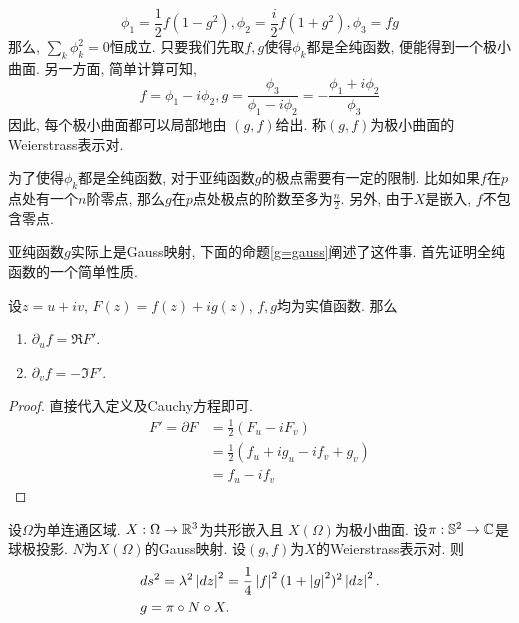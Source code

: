 \begin{equation}
    \phi_1=\frac{1}{2}f(1-g^2), \phi_2=\frac{i}{2} f(1+g^2), \phi_3=fg
\end{equation}
那么, $\sum_k \phi_k^2=0$恒成立. 只要我们先取$f,g$使得$\phi_k$都是全纯函数, 便能得到一个极小曲面. 另一方面, 简单计算可知, 
\begin{equation}
    f=\phi_1-i\phi_2, g=\frac{\phi_3}{\phi_1-i\phi_2}= -\frac{\phi_1+i\phi_2}{\phi_3}
\end{equation}
因此, 每个极小曲面都可以局部地由 $(g,f)$给出. 称$(g,f)$为极小曲面的Weierstrass表示对. 
\begin{remark}
    为了使得$\phi_k$都是全纯函数, 对于亚纯函数$g$的极点需要有一定的限制. 比如如果$f$在$p$点处有一个$n$阶零点, 那么$g$在$p$点处极点的阶数至多为$\frac{n}{2}$. 另外, 由于$X$是嵌入, $f$不包含零点.
\end{remark}
亚纯函数$g$实际上是Gauss映射, 下面的命题\eqref{g=gauss}阐述了这件事.  首先证明全纯函数的一个简单性质.
\begin{lemma}
    设$z=u+iv$, $F(z)=f(z)+ig(z)$, $f,g$均为实值函数. 那么
    \begin{enumerate}
        \item $\partial_u f = \Re F'$.
        \item $\partial_v f = -\Im F' $.
    \end{enumerate}
\end{lemma}
\begin{proof}
    直接代入定义及Cauchy方程即可.
    \begin{equation}
        \begin{split}
            F'=\partial F & = \frac{1}{2}(F_u-iF_v) \\
             &= \frac{1}{2}(f_u+ig_u-if_v+g_v) \\
             &= f_u-if_v
        \end{split}
    \end{equation}
\end{proof}
\begin{proposition} \label{g=gauss}
    设$\Omega$为单连通区域.  $X: \Omega \to \R^3$为共形嵌入且 $X(\Omega)$为极小曲面. 设$\pi: \S^2 \to \mathbb{C}$是球极投影. $N$为$X(\Omega)$的Gauss映射. 设$(g,f)$为$X$的Weierstrass表示对. 则
    \begin{align}
        &ds^2=\lambda^2\abs{dz}^2=\frac{1}{4}\abs{f}^2(1+\abs{g}^2)^2\abs{dz}^2.  \label{fg_metric}\\
        &g=\pi\circ N  \circ X.
    \end{align}
\end{proposition}
